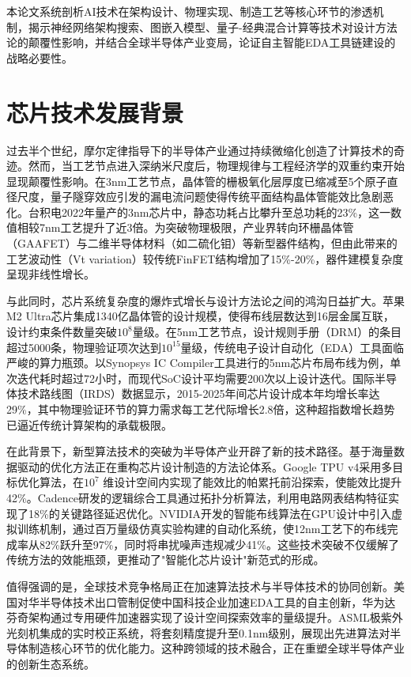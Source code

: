 \documentclass[12pt,hyperref,a4paper,UTF8]{ctexart}
\begin{document}
本论文系统剖析AI技术在架构设计、物理实现、制造工艺等核心环节的渗透机制，揭示神经网络架构搜索、图嵌入模型、量子-经典混合计算等技术对设计方法论的颠覆性影响，并结合全球半导体产业变局，论证自主智能EDA工具链建设的战略必要性。

\section{芯片技术发展背景}

过去半个世纪，摩尔定律指导下的半导体产业通过持续微缩化创造了计算技术的奇迹。然而，当工艺节点进入深纳米尺度后，物理规律与工程经济学的双重约束开始显现颠覆性影响。在3nm工艺节点，晶体管的栅极氧化层厚度已缩减至5个原子直径尺度，量子隧穿效应引发的漏电流问题使得传统平面结构晶体管能效比急剧恶化。台积电2022年量产的3nm芯片中，静态功耗占比攀升至总功耗的23\%，这一数值相较7nm工艺提升了近3倍。为突破物理极限，产业界转向环栅晶体管（GAAFET）与二维半导体材料（如二硫化钼）等新型器件结构，但由此带来的工艺波动性（Vt variation）较传统FinFET结构增加了15\%-20\%，器件建模复杂度呈现非线性增长。

与此同时，芯片系统复杂度的爆炸式增长与设计方法论之间的鸿沟日益扩大。苹果M2 Ultra芯片集成1340亿晶体管的设计规模，使得布线层数达到16层金属互联，设计约束条件数量突破$10^8$量级。在5nm工艺节点，设计规则手册（DRM）的条目超过5000条，物理验证项次达到$10^{15}$量级，传统电子设计自动化（EDA）工具面临严峻的算力瓶颈。以Synopsys IC Compiler工具进行的5nm芯片布局布线为例，单次迭代耗时超过72小时，而现代SoC设计平均需要200次以上设计迭代。国际半导体技术路线图（IRDS）数据显示，2015-2025年间芯片设计成本年均增长率达29\%，其中物理验证环节的算力需求每工艺代际增长2.8倍，这种超指数增长趋势已逼近传统计算架构的承载极限。

在此背景下，新型算法技术的突破为半导体产业开辟了新的技术路径。基于海量数据驱动的优化方法正在重构芯片设计制造的方法论体系。Google TPU v4采用多目标优化算法，在$10^7$ 维设计空间内实现了能效比的帕累托前沿探索，使能效比提升42\%。Cadence研发的逻辑综合工具通过拓扑分析算法，利用电路网表结构特征实现了18\%的关键路径延迟优化。NVIDIA开发的智能布线算法在GPU设计中引入虚拟训练机制，通过百万量级仿真实验构建的自动化系统，使12nm工艺下的布线完成率从82\%跃升至97\%，同时将串扰噪声违规减少41\%。这些技术突破不仅缓解了传统方法的效能瓶颈，更推动了"智能化芯片设计"新范式的形成。

值得强调的是，全球技术竞争格局正在加速算法技术与半导体技术的协同创新。美国对华半导体技术出口管制促使中国科技企业加速EDA工具的自主创新，华为达芬奇架构通过专用硬件加速器实现了设计空间探索效率的量级提升。ASML极紫外光刻机集成的实时校正系统，将套刻精度提升至0.1nm级别，展现出先进算法对半导体制造核心环节的优化能力。这种跨领域的技术融合，正在重塑全球半导体产业的创新生态系统。
\end{document}
